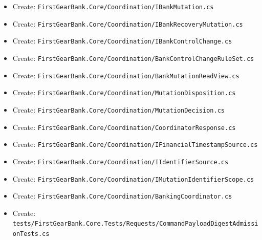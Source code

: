 \documentclass[
  10pt,
  letterpaper,
]{article}
\begin{document}
\begin{itemize}
\item
  Create:
  \texttt{FirstGearBank.}\allowbreak{}\texttt{Core/}\allowbreak{}\texttt{Coordination/}\allowbreak{}\texttt{IBankMutation.}\allowbreak{}\texttt{cs}
\item
  Create:
  \texttt{FirstGearBank.}\allowbreak{}\texttt{Core/}\allowbreak{}\texttt{Coordination/}\allowbreak{}\texttt{IBankRecoveryMutation.}\allowbreak{}\texttt{cs}
\item
  Create:
  \texttt{FirstGearBank.}\allowbreak{}\texttt{Core/}\allowbreak{}\texttt{Coordination/}\allowbreak{}\texttt{IBankControlChange.}\allowbreak{}\texttt{cs}
\item
  Create:
  \texttt{FirstGearBank.}\allowbreak{}\texttt{Core/}\allowbreak{}\texttt{Coordination/}\allowbreak{}\texttt{BankControlChangeRuleSet.}\allowbreak{}\texttt{cs}
\item
  Create:
  \texttt{FirstGearBank.}\allowbreak{}\texttt{Core/}\allowbreak{}\texttt{Coordination/}\allowbreak{}\texttt{BankMutationReadView.}\allowbreak{}\texttt{cs}
\item
  Create:
  \texttt{FirstGearBank.}\allowbreak{}\texttt{Core/}\allowbreak{}\texttt{Coordination/}\allowbreak{}\texttt{MutationDisposition.}\allowbreak{}\texttt{cs}
\item
  Create:
  \texttt{FirstGearBank.}\allowbreak{}\texttt{Core/}\allowbreak{}\texttt{Coordination/}\allowbreak{}\texttt{MutationDecision.}\allowbreak{}\texttt{cs}
\item
  Create:
  \texttt{FirstGearBank.}\allowbreak{}\texttt{Core/}\allowbreak{}\texttt{Coordination/}\allowbreak{}\texttt{CoordinatorResponse.}\allowbreak{}\texttt{cs}
\item
  Create:
  \texttt{FirstGearBank.}\allowbreak{}\texttt{Core/}\allowbreak{}\texttt{Coordination/}\allowbreak{}\texttt{IFinancialTimestampSource.}\allowbreak{}\texttt{cs}
\item
  Create:
  \texttt{FirstGearBank.}\allowbreak{}\texttt{Core/}\allowbreak{}\texttt{Coordination/}\allowbreak{}\texttt{IIdentifierSource.}\allowbreak{}\texttt{cs}
\item
  Create:
  \texttt{FirstGearBank.}\allowbreak{}\texttt{Core/}\allowbreak{}\texttt{Coordination/}\allowbreak{}\texttt{IMutationIdentifierScope.}\allowbreak{}\texttt{cs}
\item
  Create:
  \texttt{FirstGearBank.}\allowbreak{}\texttt{Core/}\allowbreak{}\texttt{Coordination/}\allowbreak{}\texttt{BankingCoordinator.}\allowbreak{}\texttt{cs}
\item
  Create:
  \texttt{tests/}\allowbreak{}\texttt{FirstGearBank.}\allowbreak{}\texttt{Core.}\allowbreak{}\texttt{Tests/}\allowbreak{}\texttt{Requests/}\allowbreak{}\texttt{CommandPayloadDigestAdmissionTests.}\allowbreak{}\texttt{cs}

\end{itemize}
\end{document}
